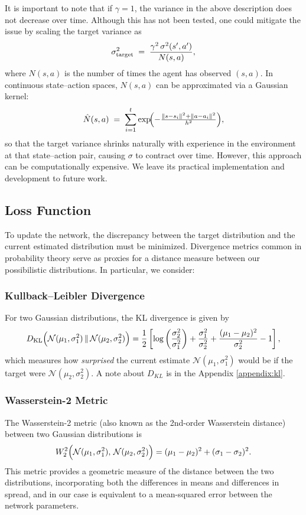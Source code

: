 \documentclass[11pt,a4paper]{report}
\begin{document}
It is important to note that if \(\gamma = 1\), the variance in the above description does not decrease over time.  Although this has not been tested, one could mitigate the issue by scaling the target variance as
\[
  \sigma^2_{\rm target}
  \;=\;
  \frac{\gamma^2\,\sigma^2(s',a')}{N(s,a)},
\]
where \(N(s,a)\) is the number of times the agent has observed \((s,a)\).  In continuous state–action spaces, \(N(s,a)\) can be approximated via a Gaussian kernel:
\[
  \hat{N}(s,a)
  \;=\;
  \sum_{i=1}^t
    \exp\!\Bigl(-\tfrac{\|s - s_i\|^2 + \|a - a_i\|^2}{h^2}\Bigr),
\]
so that the target variance shrinks naturally with experience in the environment at that state–action pair, causing \(\sigma\) to contract over time. However, this approach can be computationally expensive. We leave its practical implementation and development to future work.  

\subsection{Loss Function}

To update the network, the discrepancy between the target distribution and the current estimated distribution must be minimized. Divergence metrics common in probability theory serve as proxies for a distance measure between our possibilistic distributions. In particular, we consider:

\subsubsection{Kullback--Leibler Divergence}

For two Gaussian distributions, the KL divergence is given by
\[
  D_{\mathrm{KL}} \Bigl( \mathcal{N}(\mu_1, \sigma_1^2) \,\|\, \mathcal{N}(\mu_2, \sigma_2^2) \Bigr)
  = \frac{1}{2} \left[
    \log \left( \frac{\sigma_2^2}{\sigma_1^2} \right) +
    \frac{\sigma_1^2}{\sigma_2^2} +
    \frac{(\mu_1 - \mu_2)^2}{\sigma_2^2} - 1
  \right],
\]
which measures how \emph{surprised} the current estimate \(\mathcal{N}(\mu_1, \sigma_1^2)\) would be if the target were \(\mathcal{N}(\mu_2, \sigma_2^2)\). A note about $D_{KL}$ is in the Appendix \ref{appendix:kl}.
\subsubsection{Wasserstein-2 Metric}

The Wasserstein-2 metric (also known as the 2nd-order Wasserstein distance) between two Gaussian distributions is
\[
  W_2^2\Bigl(\mathcal{N}(\mu_1, \sigma_1^2),\,\mathcal{N}(\mu_2, \sigma_2^2)\Bigr)
  = (\mu_1 - \mu_2)^2 + (\sigma_1 - \sigma_2)^2.
\]
This metric provides a geometric measure of the distance between the two distributions, incorporating both the differences in means and differences in spread, and in our case is equivalent to a mean-squared error between the network parameters.
\end{document}
